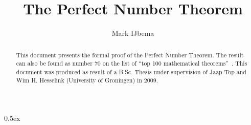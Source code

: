\documentclass[11pt,a4paper]{article}
\begin{document}
\title{The Perfect Number Theorem}
\author{Mark IJbema}
\maketitle
\begin{abstract}
This document presents the formal proof of the Perfect Number
Theorem. The result can also be found as number 70 on the list of ``top
100 mathematical theorems''~\cite{Wiedijk100}. This document was
produced as result of a B.Sc. Thesis under supervision of Jaap Top and
Wim H. Hesselink (University of Groningen) in 2009.
\end{abstract}
\tableofcontents

\parindent 0pt\parskip 0.5ex







\end{document}
